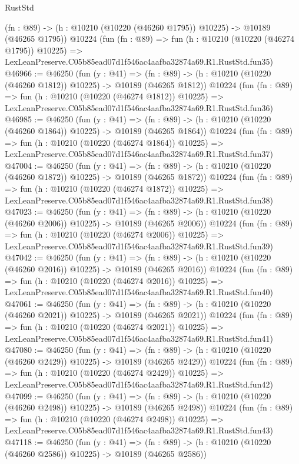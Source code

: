 \begin{lexlean}{RustStd}
\begin{coremodule}
    (fn : @89) -> (h : @10210 (@10220 (@46260 @1795)) @10225) -> @10189 (@46265 @1795))
    @10224
    (fun (fn : @89) =>
    fun (h : @10210 (@10220 (@46274 @1795)) @10225) =>
    LexLeanPreserve.C05b85ead07d1f546ac4aafba32874a69.R1.RustStd.fun35)
@46966 := @46250
    (fun (y : @41) =>
    (fn : @89) -> (h : @10210 (@10220 (@46260 @1812)) @10225) -> @10189 (@46265 @1812))
    @10224
    (fun (fn : @89) =>
    fun (h : @10210 (@10220 (@46274 @1812)) @10225) =>
    LexLeanPreserve.C05b85ead07d1f546ac4aafba32874a69.R1.RustStd.fun36)
@46985 := @46250
    (fun (y : @41) =>
    (fn : @89) -> (h : @10210 (@10220 (@46260 @1864)) @10225) -> @10189 (@46265 @1864))
    @10224
    (fun (fn : @89) =>
    fun (h : @10210 (@10220 (@46274 @1864)) @10225) =>
    LexLeanPreserve.C05b85ead07d1f546ac4aafba32874a69.R1.RustStd.fun37)
@47004 := @46250
    (fun (y : @41) =>
    (fn : @89) -> (h : @10210 (@10220 (@46260 @1872)) @10225) -> @10189 (@46265 @1872))
    @10224
    (fun (fn : @89) =>
    fun (h : @10210 (@10220 (@46274 @1872)) @10225) =>
    LexLeanPreserve.C05b85ead07d1f546ac4aafba32874a69.R1.RustStd.fun38)
@47023 := @46250
    (fun (y : @41) =>
    (fn : @89) -> (h : @10210 (@10220 (@46260 @2006)) @10225) -> @10189 (@46265 @2006))
    @10224
    (fun (fn : @89) =>
    fun (h : @10210 (@10220 (@46274 @2006)) @10225) =>
    LexLeanPreserve.C05b85ead07d1f546ac4aafba32874a69.R1.RustStd.fun39)
@47042 := @46250
    (fun (y : @41) =>
    (fn : @89) -> (h : @10210 (@10220 (@46260 @2016)) @10225) -> @10189 (@46265 @2016))
    @10224
    (fun (fn : @89) =>
    fun (h : @10210 (@10220 (@46274 @2016)) @10225) =>
    LexLeanPreserve.C05b85ead07d1f546ac4aafba32874a69.R1.RustStd.fun40)
@47061 := @46250
    (fun (y : @41) =>
    (fn : @89) -> (h : @10210 (@10220 (@46260 @2021)) @10225) -> @10189 (@46265 @2021))
    @10224
    (fun (fn : @89) =>
    fun (h : @10210 (@10220 (@46274 @2021)) @10225) =>
    LexLeanPreserve.C05b85ead07d1f546ac4aafba32874a69.R1.RustStd.fun41)
@47080 := @46250
    (fun (y : @41) =>
    (fn : @89) -> (h : @10210 (@10220 (@46260 @2429)) @10225) -> @10189 (@46265 @2429))
    @10224
    (fun (fn : @89) =>
    fun (h : @10210 (@10220 (@46274 @2429)) @10225) =>
    LexLeanPreserve.C05b85ead07d1f546ac4aafba32874a69.R1.RustStd.fun42)
@47099 := @46250
    (fun (y : @41) =>
    (fn : @89) -> (h : @10210 (@10220 (@46260 @2498)) @10225) -> @10189 (@46265 @2498))
    @10224
    (fun (fn : @89) =>
    fun (h : @10210 (@10220 (@46274 @2498)) @10225) =>
    LexLeanPreserve.C05b85ead07d1f546ac4aafba32874a69.R1.RustStd.fun43)
@47118 := @46250
    (fun (y : @41) =>
    (fn : @89) -> (h : @10210 (@10220 (@46260 @2586)) @10225) -> @10189 (@46265 @2586))

\end{coremodule}
\end{lexlean}
